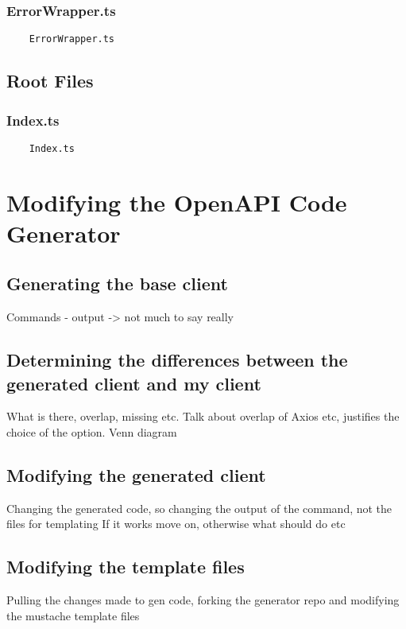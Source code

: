 \subsubsection{ErrorWrapper.ts}
\begin{verbatim}
    ErrorWrapper.ts
\end{verbatim}
\subsection{Root Files}
\subsubsection{Index.ts}
\begin{verbatim}
    Index.ts
\end{verbatim}

\section{Modifying the OpenAPI Code Generator}
\subsection{Generating the base client}
Commands - output -> not much to say really
\subsection{Determining the differences between the generated client and my client}
What is there, overlap, missing etc. Talk about overlap of Axios etc, justifies the choice of the option.
Venn diagram
\subsection{Modifying the generated client}
Changing the generated code, so changing the output of the command, not the files for templating
If it works move on, otherwise what should do etc
\subsection{Modifying the template files}
Pulling the changes made to gen code, forking the generator repo and modifying the mustache template files